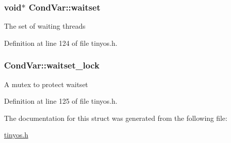 \subsubsection[{\texorpdfstring{waitset}{waitset}}]{\setlength{\rightskip}{0pt plus 5cm}void$\ast$ Cond\+Var\+::waitset}\hypertarget{structCondVar_a7da9e0169713c3b3ae386a8ab49f7e34}{}\label{structCondVar_a7da9e0169713c3b3ae386a8ab49f7e34}
The set of waiting threads 

Definition at line 124 of file tinyos.\+h.

\subsubsection[{\texorpdfstring{waitset\+\_\+lock}{waitset_lock}}]{ Cond\+Var\+::waitset\+\_\+lock}\hypertarget{structCondVar_a477b855f4d3880d231206ae79bd5b6cf}{}\label{structCondVar_a477b855f4d3880d231206ae79bd5b6cf}
A mutex to protect {\ttfamily waitset} 

Definition at line 125 of file tinyos.\+h.



The documentation for this struct was generated from the following file\+:\begin{DoxyCompactItemize}
\item 
\hyperlink{tinyos_8h}{tinyos.\+h}\end{DoxyCompactItemize}
